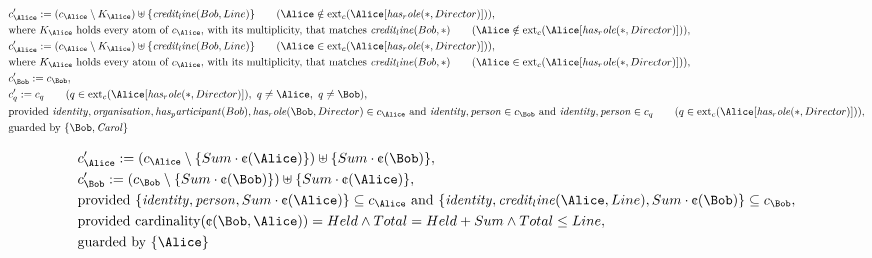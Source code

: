 \begin{align*}
&
c'_
{
\Alice
}
 := 
(
c_
{
\Alice
}
 \setminus K_
{
\Alice
}
) \uplus 
\{
\mathit{
credit_line
}
(
Bob
,
Line
)
\}
 \qquad (
\Alice
 \notin 
\mathrm{ext}_c(
\Alice
[
\mathit{
has_role
}
(
\ast
,
Director
)
]
)
)
,\\
&
\text{where } K_
{
\Alice
}
 \text{ holds every atom of } c_
{
\Alice
}
 \text{, with its multiplicity, that matches } 
\mathit{
credit_line
}
(
Bob
,
\ast
)
 \qquad (
\Alice
 \notin 
\mathrm{ext}_c(
\Alice
[
\mathit{
has_role
}
(
\ast
,
Director
)
]
)
)
,\\
&
c'_
{
\Alice
}
 := 
(
c_
{
\Alice
}
 \setminus K_
{
\Alice
}
) \uplus 
\{
\mathit{
credit_line
}
(
Bob
,
Line
)
\}
 \qquad (
\Alice
 \in 
\mathrm{ext}_c(
\Alice
[
\mathit{
has_role
}
(
\ast
,
Director
)
]
)
)
,\\
&
\text{where } K_
{
\Alice
}
 \text{ holds every atom of } c_
{
\Alice
}
 \text{, with its multiplicity, that matches } 
\mathit{
credit_line
}
(
Bob
,
\ast
)
 \qquad (
\Alice
 \in 
\mathrm{ext}_c(
\Alice
[
\mathit{
has_role
}
(
\ast
,
Director
)
]
)
)
,\\
&
c'_
{
\Bob
}
 := 
c_
{
\Bob
}
,\\
&
c'_
q
 := 
c_
q
 \qquad (
q
 \in 
\mathrm{ext}_c(
\Alice
[
\mathit{
has_role
}
(
\ast
,
Director
)
]
)
,\ 
q \neq 
\Alice
,\ 
q \neq 
\Bob
)
,\\
&
\text{provided } 
\mathit{
identity
}
,
\mathit{
organisation
}
,
\mathit{
has_participant
}
(
Bob
)
,
\mathit{
has_role
}
(
\Bob
,
Director
)
 \in c_
{
\Alice
}
 \text{ and } 
\mathit{
identity
}
,
\mathit{
person
}
 \in c_
{
\Bob
}
 \text{ and } 
\mathit{
identity
}
,
\mathit{
person
}
 \in c_
q
 \qquad (
q \in 
\mathrm{ext}_c(
\Alice
[
\mathit{
has_role
}
(
\ast
,
Director
)
]
)
)
,\\
&
\text{guarded by } \{
\Bob
,
\mathit{Carol}
\}
\end{align*}

\begin{align*}
&
c'_
{
\Alice
}
 := 
(c_
{
\Alice
}
 \setminus 
\{
Sum
\cdot
\text{\textcent}
(
\Alice
)
\}
) \uplus 
\{
Sum
\cdot
\text{\textcent}
(
\Bob
)
\}
,\\
&
c'_
{
\Bob
}
 := 
(c_
{
\Bob
}
 \setminus 
\{
Sum
\cdot
\text{\textcent}
(
\Bob
)
\}
) \uplus 
\{
Sum
\cdot
\text{\textcent}
(
\Alice
)
\}
,\\
&
\text{provided } 
\{
\mathit{
identity
}
,
\mathit{
person
}
,
Sum
\cdot
\text{\textcent}
(
\Alice
)
\}
 \subseteq c_
{
\Alice
}
 \text{ and } 
\{
\mathit{
identity
}
,
\mathit{
credit_line
}
(
\Alice
,
Line
)
,
Sum
\cdot
\text{\textcent}
(
\Bob
)
\}
 \subseteq c_
{
\Bob
}
,\\
&
\text{provided } 
\mathrm{cardinality}(
\text{\textcent}
(
\Bob
,
\Alice
)
)
=
Held
\land
Total
=
Held
+
Sum
\land
Total
\le
Line
,\\
&
\text{guarded by } \{
\Alice
\}
\end{align*}
